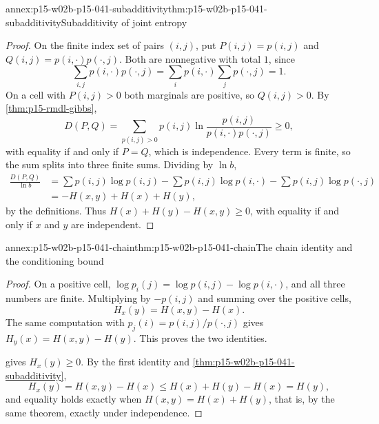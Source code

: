 \begin{annexitem}{annex:p15-w02b-p15-041-subadditivity}{thm:p15-w02b-p15-041-subadditivity}{Subadditivity of joint entropy}
\begin{proof}
On the finite index set of pairs \((i,j)\), put \(P(i,j)=p(i,j)\)
and \(Q(i,j)=p(i,\cdot)p(\cdot,j)\). Both are nonnegative with total
\(1\), since
\[
 \sum_{i,j}p(i,\cdot)p(\cdot,j)=\sum_ip(i,\cdot)\sum_jp(\cdot,j)=1 .
\]
On a cell with \(P(i,j)>0\) both marginals are
positive, so \(Q(i,j)>0\). By \cref{thm:p15-rmdl-gibbs},
\[
 D(P,Q)=\sum_{p(i,j)>0}p(i,j)\ln\frac{p(i,j)}{p(i,\cdot)p(\cdot,j)}\geq0,
\]
with equality if and only if \(P=Q\), which is independence. Every term
is finite, so the sum splits into three finite sums. Dividing by
\(\ln b\),
\begin{align*}
 \frac{D(P,Q)}{\ln b}
 &=\sum p(i,j)\log p(i,j)-\sum p(i,j)\log p(i,\cdot)
  -\sum p(i,j)\log p(\cdot,j)\\
 &=-H(x,y)+H(x)+H(y),
\end{align*}
by the definitions. Thus \(H(x)+H(y)-H(x,y)\geq0\), with equality if
and only if \(x\) and \(y\) are independent.
\end{proof}
\end{annexitem}

\begin{annexitem}{annex:p15-w02b-p15-041-chain}{thm:p15-w02b-p15-041-chain}{The chain identity and the conditioning bound}
\begin{proof}
On a positive cell, \(\log p_i(j)=\log p(i,j)-\log p(i,\cdot)\), and
all three numbers are finite. Multiplying by \(-p(i,j)\) and summing
over the positive cells,
\[
 H_x(y)=H(x,y)-H(x).
\]
The same computation with \(p_j(i)=p(i,j)/p(\cdot,j)\) gives
\(H_y(x)=H(x,y)-H(y)\). This proves the two identities.

 gives \(H_x(y)\geq0\). By the
first identity and \cref{thm:p15-w02b-p15-041-subadditivity},
\[
 H_x(y)=H(x,y)-H(x)\leq H(x)+H(y)-H(x)=H(y),
\]
and equality holds exactly when \(H(x,y)=H(x)+H(y)\), that is, by the
same theorem, exactly under independence.
\end{proof}
\end{annexitem}

